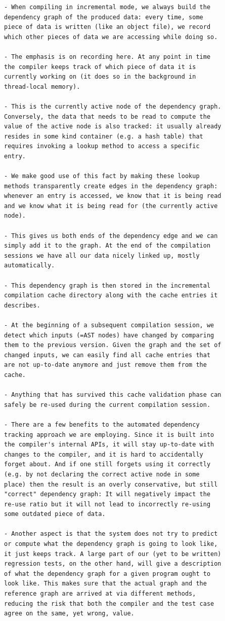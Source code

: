 \begin{verbatim}
- When compiling in incremental mode, we always build the
dependency graph of the produced data: every time, some
piece of data is written (like an object file), we record
which other pieces of data we are accessing while doing so.

- The emphasis is on recording here. At any point in time
the compiler keeps track of which piece of data it is
currently working on (it does so in the background in
thread-local memory).

- This is the currently active node of the dependency graph.
Conversely, the data that needs to be read to compute the
value of the active node is also tracked: it usually already
resides in some kind container (e.g. a hash table) that
requires invoking a lookup method to access a specific
entry.

- We make good use of this fact by making these lookup
methods transparently create edges in the dependency graph:
whenever an entry is accessed, we know that it is being read
and we know what it is being read for (the currently active
node).

- This gives us both ends of the dependency edge and we can
simply add it to the graph. At the end of the compilation
sessions we have all our data nicely linked up, mostly
automatically.

- This dependency graph is then stored in the incremental
compilation cache directory along with the cache entries it
describes.

- At the beginning of a subsequent compilation session, we
detect which inputs (=AST nodes) have changed by comparing
them to the previous version. Given the graph and the set of
changed inputs, we can easily find all cache entries that
are not up-to-date anymore and just remove them from the
cache.

- Anything that has survived this cache validation phase can
safely be re-used during the current compilation session.

- There are a few benefits to the automated dependency
tracking approach we are employing. Since it is built into
the compiler's internal APIs, it will stay up-to-date with
changes to the compiler, and it is hard to accidentally
forget about. And if one still forgets using it correctly
(e.g. by not declaring the correct active node in some
place) then the result is an overly conservative, but still
"correct" dependency graph: It will negatively impact the
re-use ratio but it will not lead to incorrectly re-using
some outdated piece of data.

- Another aspect is that the system does not try to predict
or compute what the dependency graph is going to look like,
it just keeps track. A large part of our (yet to be written)
regression tests, on the other hand, will give a description
of what the dependency graph for a given program ought to
look like. This makes sure that the actual graph and the
reference graph are arrived at via different methods,
reducing the risk that both the compiler and the test case
agree on the same, yet wrong, value.
\end{verbatim}
\cite{rust_blog_incremental_compilation}

